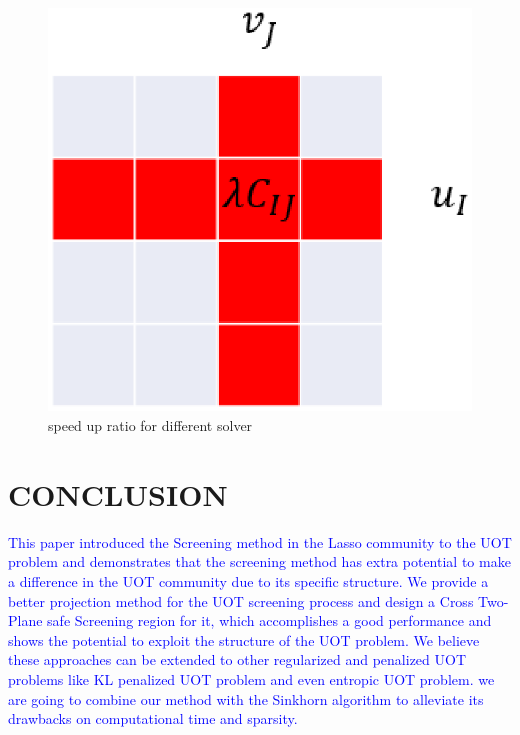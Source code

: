 \documentclass[twoside]{article}
\theoremstyle{plain}
\newcommand{\changeXS}[1]{\textcolor{blue}{#1}}
\begin{document}
	\begin{figure}[h]
	\begin{center}	
	\includegraphics[width = \linewidth]{pic/divide}
	\caption{speed up ratio for different solver}
	\end{center}	
	\end{figure}



\section{CONCLUSION}
\changeXS{This paper introduced the Screening method in the Lasso community to the UOT problem and demonstrates that the screening method has extra potential to make a difference in the UOT community due to its specific structure. We provide a better projection method for the UOT screening process and design a Cross Two-Plane safe Screening region for it, which accomplishes a good performance and shows the potential to exploit the structure of the UOT problem. We believe these approaches can be extended to other regularized and penalized UOT problems like KL penalized UOT \citep{Dantas_ICASSP_2021} problem and even entropic UOT problem. we are going to combine our method with the Sinkhorn algorithm to alleviate its drawbacks on computational time and sparsity.}

\clearpage


\end{document}
